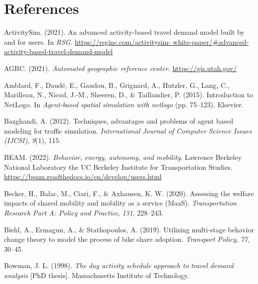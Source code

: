 \documentclass[simple, masters, twoside]{byuthesis}
\newlength{\cslhangindent}
\newlength{\cslentryspacingunit} %
\newenvironment{CSLReferences}[2] %
 {%
  \setlength{\parindent}{0pt}
  \ifodd #1
  \let\oldpar\par
  \def\par{\hangindent=\cslhangindent\oldpar}
  \fi
  \setlength{\parskip}{#2\cslentryspacingunit}
 }%
 {}
\begin{document}
\hypertarget{references}{%
\chapter*{References}\label{references}}

\hypertarget{refs}{}
\begin{CSLReferences}{1}{0}
\leavevmode{}%
ActivitySim. (2021). An advanced activity-based travel demand model built by and for users. In \emph{RSG}. \href{https://rsginc.com/activitysim-\%20white-paper/\#advanced-activity-based-travel-demand-model}{https://rsginc.com/activitysim- white-paper/\#advanced-activity-based-travel-demand-model}

\leavevmode{}%
AGRC. (2021). \emph{Automated geographic reference center}. \url{https://gis.utah.gov/}

\leavevmode{}%
Amblard, F., Daudé, E., Gaudou, B., Grignard, A., Hutzler, G., Lang, C., Marilleau, N., Nicod, J.-M., Sheeren, D., \& Taillandier, P. (2015). Introduction to NetLogo. In \emph{Agent-based spatial simulation with netlogo} (pp. 75--123). Elsevier.

\leavevmode{}%
Bazghandi, A. (2012). Techniques, advantages and problems of agent based modeling for traffic simulation. \emph{International Journal of Computer Science Issues (IJCSI)}, \emph{9}(1), 115.

\leavevmode{}%
BEAM. (2022). \emph{Behavior, energy, autonomy, and mobility}. Lawrence Berkeley National Laboratory the UC Berkeley Institute for Transportation Studies. \url{https://beam.readthedocs.io/en/develop/users.html}

\leavevmode{}%
Becker, H., Balac, M., Ciari, F., \& Axhausen, K. W. (2020). Assessing the welfare impacts of shared mobility and mobility as a service (MaaS). \emph{Transportation Research Part A: Policy and Practice}, \emph{131}, 228--243.

\leavevmode{}%
Biehl, A., Ermagun, A., \& Stathopoulos, A. (2019). Utilizing multi-stage behavior change theory to model the process of bike share adoption. \emph{Transport Policy}, \emph{77}, 30--45.

\leavevmode{}%
Bowman, J. L. (1998). \emph{The day activity schedule approach to travel demand analysis} {[}PhD thesis{]}. Massachusetts Institute of Technology.


\end{CSLReferences}
\end{document}
